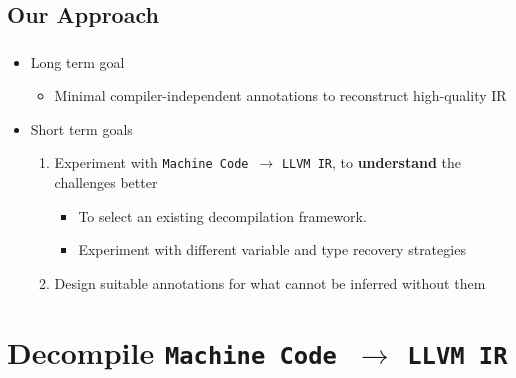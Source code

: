\documentclass[mathserif,10pt]{beamer}
\newcommand{\cmt}[1]{}
\newcommand{\LIR}{{\tt LLVM IR}}
\newcommand{\MC}{{\tt Machine Code}}
\begin{document}
  \subsection*{Our Approach}
  \frame
  {
    \frametitle{\subsecname}
    \begin{itemize}
      \item Long term goal
        \begin{itemize}
          \item Minimal compiler-independent annotations to reconstruct high-quality IR
        \end{itemize}    
      \item Short term goals
        \begin{enumerate}
          \item Experiment with \MC\ $\rightarrow$ \LIR, to \textbf{understand} the challenges better
            \begin{itemize}
              \item To select an existing decompilation framework.
              \item Experiment with different variable and type recovery strategies
            \end{itemize}    
          \item Design suitable annotations for what cannot be inferred without them
        \end{enumerate}    
    \end{itemize}

      \cmt{

** Note: "Ship LLVM IR with machine code" already exists!  But requires source code and an LLVM-based compiler
      }


  }


\section{Decompile \MC \ $\rightarrow$ \LIR}
\end{document}

